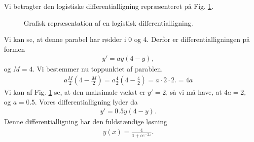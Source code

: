 \begin{exa}
	Vi betragter den logistiske differentialligning repræsenteret på Fig. \ref{fig:logist2}.
	\begin{figure}[H]
		\centering
		\caption{Grafisk repræsentation af en logistisk differentialligning.}
		\label{fig:logist2}
	\end{figure}
	Vi kan se, at denne parabel har rødder i 0 og 4. Derfor er differentialligningen på formen
	\begin{align*}
		y' = ay(4-y),
	\end{align*}
	og $M =4$. Vi bestemmer nu toppunktet af parablen.
	\begin{align*}
		a\frac{M}{2}(4-\frac{M}{2}) = a\frac{4}{2}(4-\frac{4}{2}) = a\cdot 2\cdot 2. = 4a
	\end{align*}
	Vi kan af Fig. \ref{fig:logist2} se, at den maksimale vækst er $y' = 2$, så vi må have, at $4a = 2$, og $a=0.5$.
	Vores differentialligning lyder da
	\begin{align*}
		y' = 0.5y(4-y).
	\end{align*}
	Denne differentialligning har den fuldstændige løsning
	\begin{align*}
		y(x) = \frac{4}{1+ce^{-2x}}.
	\end{align*}
\end{exa}

\newpage
